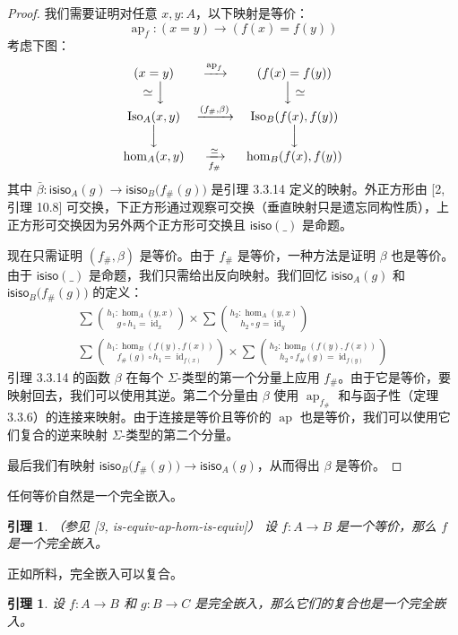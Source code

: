 \documentclass{ctexrep}
\theoremstyle{plain}
\newtheorem{lemma}[theorem]{引理}
\theoremstyle{definition}
\theoremstyle{remark}
\theoremstyle{definition}
\theoremstyle{definition}
\theoremstyle{definition}
\newcommand{\ap}{\operatorname{ap}}
\newcommand{\id}{\operatorname{id}}
\newcommand{\Iso}{\operatorname{Iso}}
\newcommand{\isiso}{\mathsf{isiso}}
\begin{document}
\begin{proof}
我们需要证明对任意 $x, y : A$，以下映射是等价：
\[
\ap_f : (x = y) \to (f(x) = f(y))
\]
考虑下图：
\[
\begin{array}{ccc}
(x = y) & \xrightarrow{\ap_f} & (f(x)=f(y)) \\
\simeq \Big\downarrow & & \Big\downarrow \simeq \\
\Iso_A(x, y) & \xrightarrow{(f_{\#},\beta)} & \Iso_B(f(x), f(y)) \\
\Big\downarrow & & \Big\downarrow \\
\hom_A(x,y) & \xrightarrow[f_\#]{\simeq} & \hom_B(f(x), f(y))
\end{array}
\]
其中 $\bar{\beta} : \isiso_A(g) \to \isiso_B\bigl(f_\#(g)\bigr)$ 是引理 3.3.14 定义的映射。外正方形由 [2, 引理 10.8] 可交换，下正方形通过观察可交换（垂直映射只是遗忘同构性质），上正方形可交换因为另外两个正方形可交换且 $\isiso(\_)$ 是命题。

现在只需证明 $(f_\#, \beta)$ 是等价。由于 $f_\#$ 是等价，一种方法是证明 $\beta$ 也是等价。由于 $\isiso(\_)$ 是命题，我们只需给出反向映射。我们回忆 $\isiso_A(g)$ 和 $\isiso_B\bigl(f_\#(g)\bigr)$ 的定义：
\[
\begin{array}{c}
\displaystyle\sum\binom{h_1 : \hom_A(y,x)}{g \circ h_1 = \id_x} \times \sum\binom{h_2 : \hom_A(y,x)}{h_2 \circ g = \id_y} \\[2em]
\displaystyle\sum\binom{h_1 : \hom_B(f(y), f(x))}{f_\#(g) \circ h_1 = \id_{f(x)}} \times \sum\binom{h_2 : \hom_B(f(y), f(x))}{h_2 \circ f_\#(g) = \id_{f(y)}}
\end{array}
\]
引理 3.3.14 的函数 $\beta$ 在每个 $\Sigma$-类型的第一个分量上应用 $f_\#$。由于它是等价，要映射回去，我们可以使用其逆。第二个分量由 $\beta$ 使用 $\ap_{f_\#}$ 和与函子性（定理 3.3.6）的连接来映射。由于连接是等价且等价的 $\ap$ 也是等价，我们可以使用它们复合的逆来映射 $\Sigma$-类型的第二个分量。

最后我们有映射 $\isiso_B\bigl(f_\#(g)\bigr) \to \isiso_A(g)$，从而得出 $\beta$ 是等价。
\end{proof}

任何等价自然是一个完全嵌入。

\begin{lemma}（参见 [3, is-equiv-ap-hom-is-equiv]）
设 $f:A\to B$ 是一个等价，那么 $f$ 是一个完全嵌入。
\end{lemma}

正如所料，完全嵌入可以复合。

\begin{lemma}
设 $f:A\to B$ 和 $g:B\to C$ 是完全嵌入，那么它们的复合也是一个完全嵌入。
\end{lemma}
\end{document}
